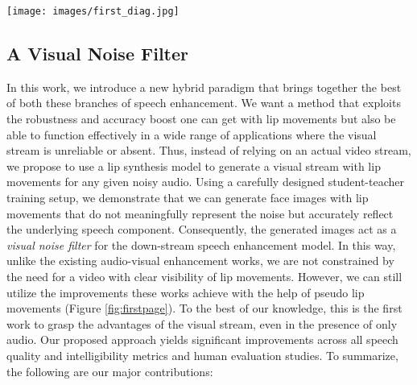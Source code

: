 \documentclass[10pt,twocolumn,letterpaper]{article}
\begin{document}
\begin{figure*}[t]
  \texttt{[image: images/first\_diag.jpg]}
  \caption{We propose a novel approach to enhance the speech by hallucinating the visual stream for any given noisy audio. In contrast to the existing audio-visual methods, our approach works even in the absence of a reliable visual stream, while also performing better than audio-only works in unconstrained conditions due to the assistance of generated lip movements.}
  \label{fig:firstpage}
\end{figure*}

\subsection{A Visual Noise Filter}
In this work, we introduce a new hybrid paradigm that brings together the best of both these branches of speech enhancement. We want a method that exploits the robustness and accuracy boost one can get with lip movements but also be able to function effectively in a wide range of applications where the visual stream is unreliable or absent. Thus, instead of relying on an actual video stream, we propose to use a lip synthesis model to generate a visual stream with lip movements for any given noisy audio. Using a carefully designed student-teacher training setup, we demonstrate that we can generate face images with lip movements that do not meaningfully represent the noise but accurately reflect the underlying speech component. Consequently, the generated images act as a \textit{visual noise filter} for the down-stream speech enhancement model. In this way, unlike the existing audio-visual enhancement works, we are not constrained by the need for a video with clear visibility of lip movements. However, we can still utilize the improvements these works achieve with the help of pseudo lip movements (Figure \ref{fig:firstpage}). To the best of our knowledge, this is the first work to grasp the advantages of the visual stream, even in the presence of only audio. Our proposed approach yields significant improvements across all speech quality and intelligibility metrics and human evaluation studies. To summarize, the following are our major contributions:
\end{document}
